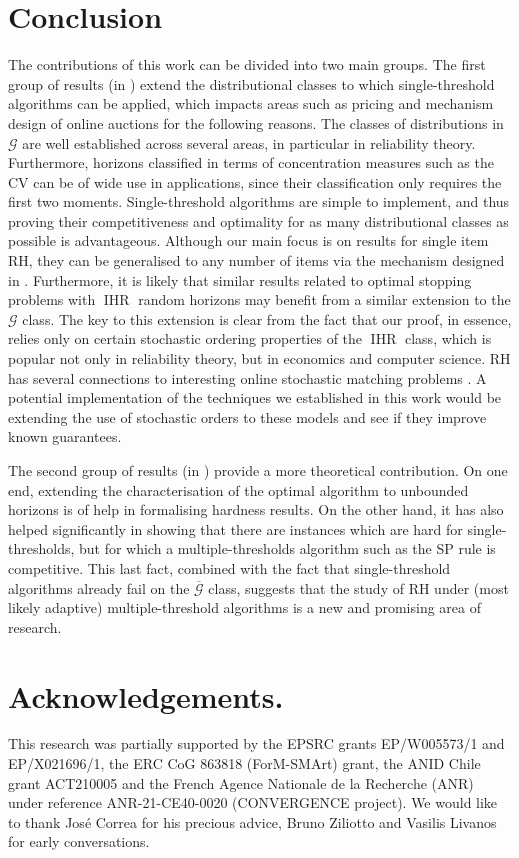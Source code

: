 \documentclass[11pt, a4paper, twoside]{article}
\newcommand{\PGF}{\mathcal{G}}
\newcommand{\PGFd}{\overline{\mathcal{G}}}
\DeclareMathOperator{\IHR}{IHR}
\numberwithin{equation}{section}
\begin{document}
    \section{Conclusion}
    The contributions of this work can be divided into two main groups. The first group of results (in ) extend the distributional classes to which single-threshold algorithms can be applied, which impacts areas such as pricing and mechanism design of online auctions for the following reasons. The classes of distributions in $\PGF$ are well established across several areas, in particular in reliability theory. Furthermore, horizons classified in terms of concentration measures such as the $\text{CV}$ can be of wide use in applications, since their classification only requires the first two moments. Single-threshold algorithms are simple to implement, and thus proving their competitiveness and optimality for as many distributional classes as possible is advantageous. Although our main focus is on results for single item RH, they can be generalised to any number of items via the mechanism designed in \cite{AliBanGolMunWan20}. Furthermore, it is likely that similar results related to optimal stopping problems with $\IHR$ random horizons may benefit from a similar extension to the $\PGF$ class. The key to this extension is clear from the fact that our proof, in essence, relies only on certain stochastic ordering properties of the $\IHR$ class, which is popular not only in reliability theory, but in economics and computer science. RH has several connections to interesting online stochastic matching problems \cite{AouMa23}. A potential implementation of the techniques we established in this work would be extending the use of stochastic orders to these models and see if they improve known guarantees.
        
    The second group of results (in ) provide a more theoretical contribution. On one end, extending the characterisation of the optimal algorithm to unbounded horizons is of help in formalising hardness results. On the other hand, it has also helped significantly in showing that there are instances which are hard for single-thresholds, but for which a multiple-thresholds algorithm such as the SP rule is competitive. This last fact, combined with the fact that single-threshold algorithms already fail on the $\PGFd$ class, suggests that the study of RH under (most likely adaptive) multiple-threshold algorithms is a new and promising area of research.
	\section*{Acknowledgements.}This research was partially supported by the EPSRC grants EP/W005573/1 and EP/X021696/1, the ERC CoG 863818 (ForM-SMArt) grant, the ANID Chile grant ACT210005 and the French Agence Nationale de la Recherche (ANR) under reference ANR-21-CE40-0020 (CONVERGENCE project). We would like to thank Jos\'{e} Correa for his precious advice, Bruno Ziliotto and Vasilis Livanos for early conversations.    

	\clearpage
        \appendix
        \renewcommand{\appendixpagename}{Supplementary materials}
	\appendixpage
\end{document}
